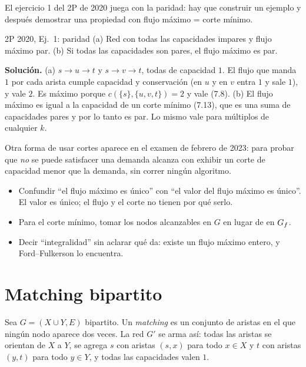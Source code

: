 El ejercicio 1 del 2P de 2020 juega con la paridad: hay que construir un ejemplo y después demostrar una propiedad con flujo máximo = corte mínimo.

\begin{problema}{2P 2020, Ej.~1: paridad}
(a) Red con todas las capacidades impares y flujo máximo par. (b) Si todas las capacidades son pares, el flujo máximo es par.

\smallskip
\textbf{Solución.} (a) $s\to u\to t$ y $s\to v\to t$, todas de capacidad $1$. El flujo que manda $1$ por cada arista cumple capacidad y conservación (en $u$ y en $v$ entra $1$ y sale $1$), y vale $2$. Es máximo porque $c(\{s\},\{u,v,t\})=2$ y vale (7.8). (b) El flujo máximo es igual a la capacidad de un corte mínimo (7.13), que es una suma de capacidades pares y por lo tanto es par. Lo mismo vale para múltiplos de cualquier $k$.
\end{problema}

Otra forma de usar cortes aparece en el examen de febrero de 2023: para probar que \emph{no} se puede satisfacer una demanda alcanza con exhibir un corte de capacidad menor que la demanda, sin correr ningún algoritmo.

\begin{trampa}
\begin{itemize}
  \item Confundir ``el flujo máximo es único'' con ``el valor del flujo máximo es único''. El valor es único; el flujo y el corte no tienen por qué serlo.
  \item Para el corte mínimo, tomar los nodos alcanzables en $G$ en lugar de en $G_f$.
  \item Decir ``integralidad'' sin aclarar qué da: existe un flujo máximo entero, y Ford–Fulkerson lo encuentra.
\end{itemize}
\end{trampa}

\section{Matching bipartito}

Sea $G=(X\cup Y,E)$ bipartito. Un \emph{matching} es un conjunto de aristas en el que ningún nodo aparece dos veces. La red $G'$ se arma así: todas las aristas se orientan de $X$ a $Y$, se agrega $s$ con aristas $(s,x)$ para todo $x\in X$ y $t$ con aristas $(y,t)$ para todo $y\in Y$, y todas las capacidades valen $1$.

